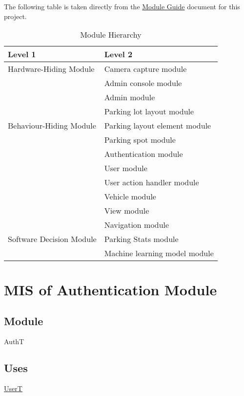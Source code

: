 \documentclass[12pt, titlepage]{article}
\begin{document}
The following table is taken directly from the
\href{https://github.com/parkd-app/park-d/blob/main/docs/Design/MG/MG.pdf}{Module
Guide} document for this project.

\begin{table}[h!]
\centering
\begin{tabular}{p{} p{}}
\toprule
\textbf{Level 1} & \textbf{Level 2}\\
\midrule

{Hardware-Hiding Module} & Camera capture module \\
\midrule

\multirow{7}{0.3\textwidth}{Behaviour-Hiding Module} & Admin console module\\
& Admin module\\
& Parking lot layout module\\
& Parking layout element module\\
& Parking spot module\\
& Authentication module\\
& User module\\
& User action handler module\\
& Vehicle module\\
& View module\\
\midrule

\multirow{3}{0.3\textwidth}{Software Decision Module} & Navigation module\\
& Parking Stats module\\
& Machine learning model module\\
\bottomrule

\end{tabular}
\caption{Module Hierarchy}
\label{TblMH}
\end{table}

\newpage

\section{MIS of Authentication Module} 
\label{auth:Module}

\subsection{Module}
AuthT

\subsection{Uses}
\hyperref[user:Module]{UserT}
\end{document}
